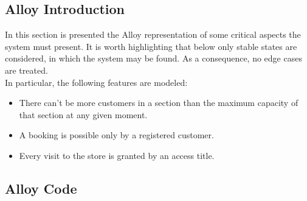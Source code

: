 \subsection{Alloy Introduction}

In this section is presented the Alloy representation of some critical aspects the system must present.
It is worth highlighting that below only stable states are considered, in which the system may be found.
As a consequence, no edge cases are treated. \\
In particular, the following features are modeled:
\begin{itemize}
    \item There can't be more customers in a section than the maximum capacity of that section at any given moment.
    \item A booking is possible only by a registered customer.
    \item Every visit to the store is granted by an access title.
\end{itemize}

\subsection{Alloy Code}

